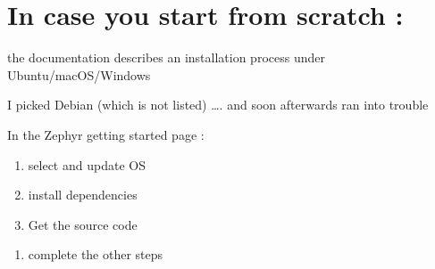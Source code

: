 \documentclass[letterpaper,10pt,english]{sphinxmanual}
\begin{document}
\section{In case you start from scratch :}
\label{\detokenize{installation:in-case-you-start-from-scratch}}

the documentation describes an installation process under Ubuntu/macOS/Windows

I picked Debian (which is not listed)
…. and soon afterwards ran into trouble


In the Zephyr getting started page :
\begin{enumerate}
%
\item {} 
select and update OS

\item {} 
install dependencies

\item {} 
Get the source code

\end{enumerate}

\begin{sphinxVerbatim}[commandchars=\\\{\}]
    
        
         
        
        

    
         
         
         
           
         
\end{sphinxVerbatim}
\begin{enumerate}
%
\setcounter{enumi}{3}
\item {} 
complete the other steps

\end{enumerate}
\end{document}

